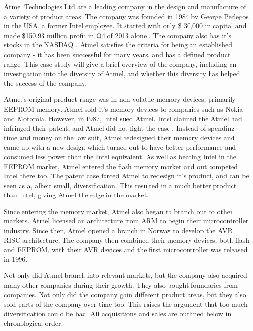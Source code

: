 

Atmel Technologies Ltd are a leading company in the design and manufacture of a variety of product areas. 
The company was founded in 1984 by George Perlegos in the USA, a former Intel employee. 
It started with only \$ 30,000 in capital \cite{atmel:capital} and made \$150.93 million profit in Q4 of 2013 alone \cite{atmel:profit}.
The company also has it's stocks in the NASDAQ \cite{atmel:nasdaq}.
Atmel satisfies the criteria for being an established company - it has been successful for many years, and has a defined product range.
This case study will give a brief overview of the company, including an investigation into the diversity of Atmel, and whether this diversity has helped the success of the company.



Atmel's original product range was in non-volatile memory devices, primarily EEPROM memory.
Atmel sold it's memory devices to companies such as Nokia and Motorola.
However, in 1987, Intel sued Atmel.
Intel claimed the Atmel had infringed their patent, and Atmel did not fight the case \cite{atmel:intel}.
Instead of spending time and money on the law suit, Atmel redesigned their memory devices and came up with a new design which turned out to have better performance and consumed less power than the Intel equivalent.
As well as beating Intel in the EEPROM market, Atmel entered the flash memory market and out competed Intel there too.
The patent case forced Atmel to redesign it's product, and can be seen as a, albeit small, diversification.
This resulted in a much better product than Intel, giving Atmel the edge in the market.


Since entering the memory market, Atmel also began to branch out to other markets. 
Atmel licensed an architecture from ARM to begin their microcontroller industry.
Since then, Atmel opened a branch in Norway to develop the AVR RISC architecture.
The company then combined their memory devices, both flash and EEPROM, with their AVR devices and the first microcontroller was released in 1996.

Not only did Atmel branch into relevant markets, but the company also acquired many other companies during their growth. They also bought foundaries from companies. 
Not only did the company gain different product areas, but they also sold parts of the company over time too. 
This raises the argument that too much diversification could be bad.
All acquisitions and sales are outlined below in chronological order.%

